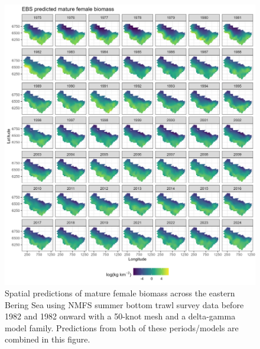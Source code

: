 \documentclass[
]{article}
\begin{document}
\begin{figure}

{\centering \includegraphics[width=1\linewidth,height=1\textheight]{../BAIRDI/Figures/EBS_matfem_spatbio} 

}

\caption{Spatial predictions of mature female biomass across the eastern Bering Sea using NMFS summer bottom trawl survey data before 1982 and 1982 onward with a 50-knot mesh and a delta-gamma model family. Predictions from both of these periods/models are combined in this figure.}\label{fig:spatpred-bio-50-matfem}
\end{figure}
\end{document}
